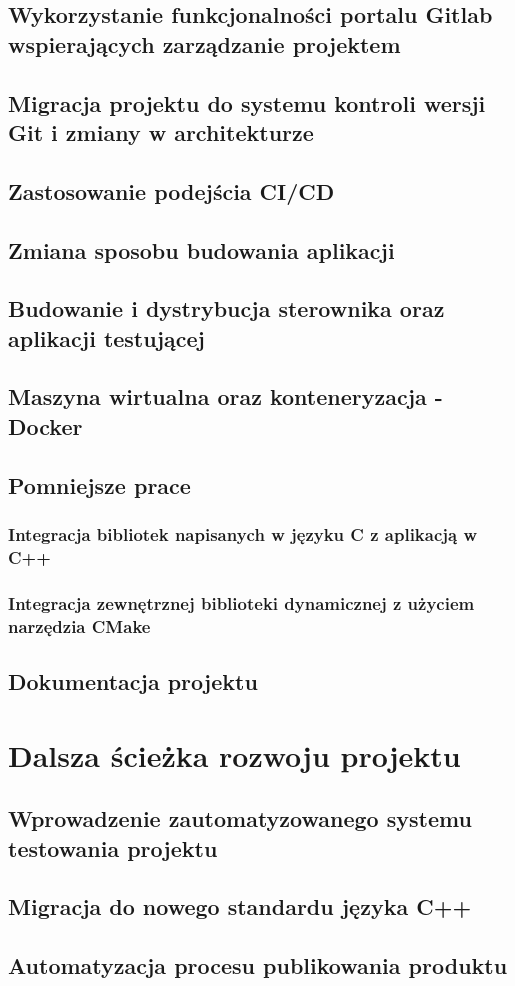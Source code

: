 \section{Wykorzystanie funkcjonalności portalu Gitlab wspierających zarządzanie projektem}
\section{Migracja projektu do systemu kontroli wersji Git i zmiany w architekturze}
\section{Zastosowanie podejścia CI/CD}
\section{Zmiana sposobu budowania aplikacji}
\section{Budowanie i dystrybucja sterownika oraz aplikacji testującej}
\section{Maszyna wirtualna oraz konteneryzacja - Docker}
\section{Pomniejsze prace}
\subsection{Integracja bibliotek napisanych w języku C z aplikacją w C++}
\subsection{Integracja zewnętrznej biblioteki dynamicznej z użyciem narzędzia CMake}
\section{Dokumentacja projektu}

\chapter{Dalsza ścieżka rozwoju projektu}
\label{cha:dalsze}

\section{Wprowadzenie zautomatyzowanego systemu testowania projektu}
\section{Migracja do nowego standardu języka C++}
\section{Automatyzacja procesu publikowania produktu}

